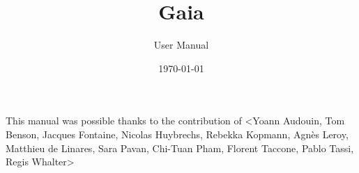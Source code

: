 \documentclass[Gaia]{../../data/TelemacDoc} %
\begin{document}
\let\cleardoublepage\clearpage

\setlength\parindent{0pt}

\title{Gaia}
\subtitle{User Manual}
\version{\telmaversion}
\date{\today}
\maketitle
\clearpage



\newpage

\thispagestyle{empty}

\TelemacCopyright{}




\pagestyle{empty} %

\tableofcontents%


\pagestyle{fancy} %

\pagebreak
This manual was possible thanks to the contribution of <Yoann Audouin, Tom Benson, Jacques Fontaine, Nicolas Huybrechs, Rebekka Kopmann, Agn\`es Leroy, Matthieu de Linares, Sara Pavan, Chi-Tuan Pham,  Florent Taccone, Pablo Tassi, Regis Whalter>
\pagebreak



\end{document}
